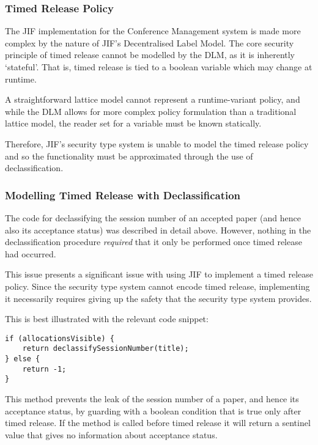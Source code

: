 \subsubsection{Timed Release Policy}

The JIF implementation for the Conference Management system is made more complex by the nature of JIF's Decentralised Label Model. The core security principle of timed release cannot be modelled by the DLM, as it is inherently `stateful'. That is, timed release is tied to a boolean variable which may change at runtime.

A straightforward lattice model cannot represent a runtime-variant policy, and while the DLM allows for more complex policy formulation than a traditional lattice model, the reader set for a variable must be known statically.

Therefore, JIF's security type system is unable to model the timed release policy and so the functionality must be approximated through the use of declassification.

\subsubsection{Modelling Timed Release with Declassification}

The code for declassifying the session number of an accepted paper (and hence also its acceptance status) was described in detail above. However, nothing in the declassification procedure \textit{required} that it only be performed once timed release had occurred.

This issue presents a significant issue with using JIF to implement a timed release policy. Since the security type system cannot encode timed release, implementing it necessarily requires giving up the safety that the security type system provides.

This is best illustrated with the relevant code snippet:

\begin{verbatim}
if (allocationsVisible) {
	return declassifySessionNumber(title);
} else {
	return -1;
}
\end{verbatim}

This method prevents the leak of the session number of a paper, and hence its acceptance status, by guarding with a boolean condition that is true only after timed release. If the method is called before timed release it will return a sentinel value that gives no information about acceptance status.

